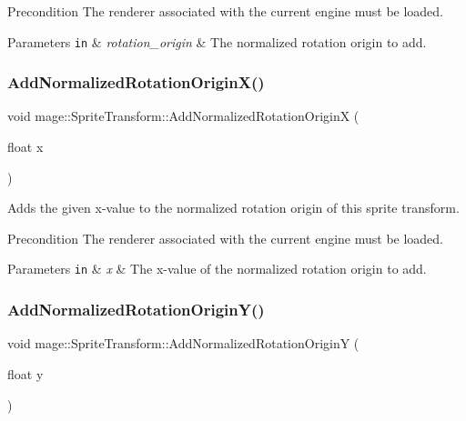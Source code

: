 \begin{DoxyPrecond}{Precondition}
The renderer associated with the current engine must be loaded. 
\end{DoxyPrecond}

\begin{DoxyParams}[1]{Parameters}
\mbox{\tt in}  & {\em rotation\+\_\+origin} & The normalized rotation origin to add. \\
\hline
\end{DoxyParams}
\hypertarget{structmage_1_1_sprite_transform_a8051d03c7bb8d634c5a2b62efc1f14b0}{}\label{structmage_1_1_sprite_transform_a8051d03c7bb8d634c5a2b62efc1f14b0} 
\subsubsection{\texorpdfstring{Add\+Normalized\+Rotation\+Origin\+X()}{AddNormalizedRotationOriginX()}}
{\footnotesize\ttfamily void mage\+::\+Sprite\+Transform\+::\+Add\+Normalized\+Rotation\+OriginX (\begin{DoxyParamCaption}\item[{float}]{x }\end{DoxyParamCaption})}

Adds the given x-\/value to the normalized rotation origin of this sprite transform.

\begin{DoxyPrecond}{Precondition}
The renderer associated with the current engine must be loaded. 
\end{DoxyPrecond}

\begin{DoxyParams}[1]{Parameters}
\mbox{\tt in}  & {\em x} & The x-\/value of the normalized rotation origin to add. \\
\hline
\end{DoxyParams}
\hypertarget{structmage_1_1_sprite_transform_acff839babfd83b886607a1fdc5e8ec93}{}\label{structmage_1_1_sprite_transform_acff839babfd83b886607a1fdc5e8ec93} 
\subsubsection{\texorpdfstring{Add\+Normalized\+Rotation\+Origin\+Y()}{AddNormalizedRotationOriginY()}}
{\footnotesize\ttfamily void mage\+::\+Sprite\+Transform\+::\+Add\+Normalized\+Rotation\+OriginY (\begin{DoxyParamCaption}\item[{float}]{y }\end{DoxyParamCaption})}

